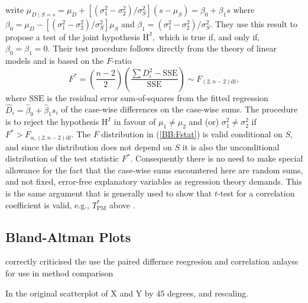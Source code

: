 \cite{BradBlack89} write $\mu_{D \mid S=s} = \mu_D + [ ( \sigma^2_1 - \sigma^2_2) / \sigma^2_S ] (s - \mu_S) = \beta_0 + \beta_1 s$ where $\beta_0=\mu_D- [(\sigma^2_1-\sigma^2_2)/ \sigma^2_S] \mu_S$ and $\beta_1 = (\sigma^2_1 - \sigma^2_2 )/ \sigma^2_S.$ They use this result to propose a test of the joint hypothesis $\textrm{H}^\mathrm{J},$ which is true if, and only if, $\beta_0=\beta_1=0.$ Their test procedure follows directly from the theory of linear models \citep[for example]{Hogg} and is based on the $F$-ratio
\begin{equation}\label{BB:Fstat}
F^* = (\frac{n-2}{2}) (\frac{\sum {D_i^2} - \mathrm{SSE}}{\mathrm{SSE}}) \sim F_{(2,n-2)\textrm{df}} ,
\end{equation}
where $\mathrm{SSE}$ is the residual error sum-of-squares from the fitted regression $\hat{D}_i=\hat{\beta}_0 +\hat{\beta}_1 s_i$ of the case-wise differences on the case-wise sums. The procedure is to reject the hypothesis $\textrm{H}^\mathrm{J}$ in favour of $\mu_1\neq\mu_2$ and (or) $\sigma^2_1\neq\sigma^2_2$ if $F^* >  F_{\alpha,(2,n-2)\textrm{df}}.$ The $F$ distribution in (\ref{BB:Fstat}) is valid conditional on $S,$ and since the distribution does not depend on $S$ it is also the unconditional distribution of the test statistic $F^*.$ Consequently there is no need to make special allowance for the fact that the case-wise sums encountered here are random sums, and not fixed, error-free explanatory variables as regression theory demands.   This is the same argument that is generally used to show that $t$-test for a correlation coefficient is valid, e.g., $T^*_\mathrm{PM}$ above \citep[page 499]{Hogg}.




\subsection*{Bland-Altman Plots}

\citet{BA83} correctly criticised the use the paired differnce reegresion and correlation anlayss for use in method comparison




In the original scatterplot of X and Y by 45 degrees, and rescaling.


